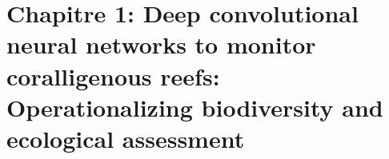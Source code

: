 \renewcommand*{\theHsection}{Deep.\the\value{section}}

\chapter[Deep convolutional neural networks to monitor coralligenous reefs: Operationalizing biodiversity and ecological assessment]{Chapitre 1: Deep convolutional neural networks to monitor coralligenous reefs: Operationalizing biodiversity and ecological assessment} \label{chapitre1-deep}

\pagestyle{main}

\begin{center}
\end{center}

